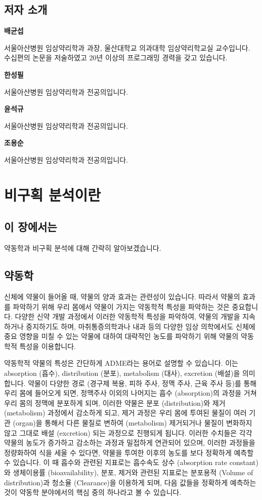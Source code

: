 \documentclass[]{krantz}
\theoremstyle{definition}
\theoremstyle{definition}
\theoremstyle{definition}
\theoremstyle{remark}
\begin{document}
\subsection*{저자 소개}\label{-}

\textbf{배균섭}

서울아산병원 임상약리학과 과장, 울산대학교 의과대학 임상약리학교실
교수입니다. 수십편의 논문을 저술하였고 20년 이상의 프로그래밍 경력을
갖고 있습니다.

\textbf{한성필}

서울아산병원 임상약리학과 전공의입니다.

\textbf{윤석규}

서울아산병원 임상약리학과 전공의입니다.

\textbf{조용순}

서울아산병원 임상약리학과 전공의입니다.

\section{비구획 분석이란}\label{introduction}

\subsection{이 장에서는}\label{summary-introduction}

약동학과 비구획 분석에 대해 간략히 알아보겠습니다.

\subsection{약동학}\label{PK-introduction}

신체에 약물이 들어올 때, 약물의 양과 효과는 관련성이 있습니다. 따라서
약물의 효과를 파악하기 위해 우리 몸에서 약물이 가지는 약동학적 특성을
파악하는 것은 중요합니다. 다양한 신약 개발 과정에서 이러한 약동학적
특성을 파악하여, 약물의 개발을 지속하거나 중지하기도 하며,
마취통증의학과나 내과 등의 다양한 임상 의학에서도 신체에 중요 영향을
미칠 수 있는 약물에 대하여 대략적인 농도를 파악하기 위해 약물의 약동학적
특성을 이용합니다.

약동학적 약물의 특성은 간단하게 ADME라는 용어로 설명할 수 있습니다. 이는
absorption (흡수), distribution (분포), metabolism (대사), excretion
(배설)을 의미합니다. 약물이 다양한 경로 (경구제 복용, 피하 주사, 정맥
주사, 근육 주사 등)를 통해 우리 몸에 들어오게 되면, 정맥주사 이외의
나머지는 흡수 (absorption)의 과정을 거쳐 우리 몸의 정맥에 분포하게 되며,
이러한 약물은 분포 (distribution)와 제거 (metabolism) 과정에서 감소하게
되고, 제거 과정은 우리 몸에 투여된 물질이 여러 기관 (organ)을 통해서
다른 물질로 변하여 (metabolism) 제거되거나 물질이 변화하지 않고 그대로
배설 (excretion) 되는 과정으로 진행되게 됩니다. 이러한 수치들은 각각
약물의 농도가 증가하고 감소하는 과정과 밀접하게 연관되어 있으며, 이러한
과정들을 정량화하여 식을 세울 수 있다면, 약물을 투여한 이후의 농도를
보다 정확하게 예측할 수 있습니다. 이 때 흡수와 관련된 지표로는 흡수속도
상수 (absorption rate constant)와 생체이용률 (bioavailability), 분포,
제거와 관련된 지표로는 분포용적 (Volume of distribution)과 청소율
(Clearance)을 이용하게 되며, 다음 값들을 정확하게 예측하는 것이 약동학
분야에서의 핵심 중의 하나라고 볼 수 있습니다.
\end{document}
